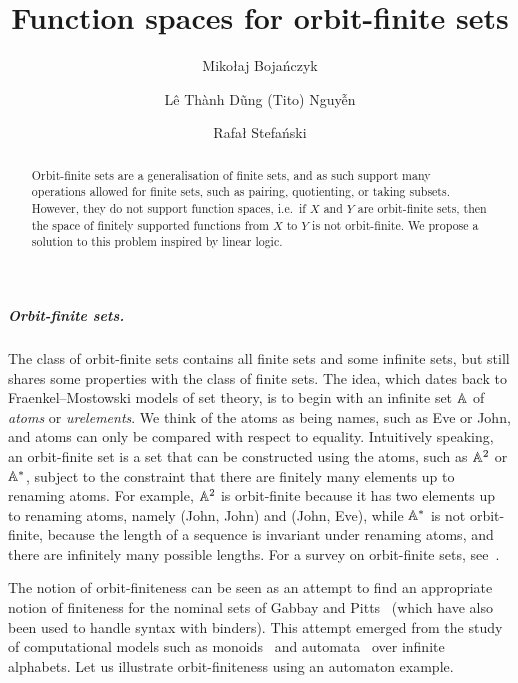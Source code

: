 \documentclass[a4paper,UKenglish,cleveref, autoref, thm-restate]{lipics-v2021}
\title{Function spaces for orbit-finite sets} %
\author{Mikołaj Bojańczyk}{University of Warsaw, Poland \and \url{https://www.mimuw.edu.pl/~bojan/}}{bojan@mimuw.edu.pl}{https://orcid.org/0000-0002-7758-1072}{}%
\author{Lê Thành Dũng (Tito) Nguy\~{\^{e}}n}{École normale supérieure de Lyon, France \and \url{https://nguyentito.eu/}}{nltd@nguyentito.eu}{https://orcid.org/0000-0002-6900-5577}{}
\author{Rafał Stefański}{University of Warsaw, Poland}{rafal.stefanski@mimuw.edu.pl}{https://orcid.org/0000-0002-8439-4056}{}%
\begin{document}
\newcommand{\loli}{\multimap}


\maketitle 
\begin{abstract}
    Orbit-finite sets are a generalisation of finite sets, and as such support many operations allowed for finite sets, such as pairing, quotienting, or taking subsets. However, they do not support function spaces, i.e.~if $X$ and $Y$ are orbit-finite sets, then the space of finitely supported functions from $X$ to $Y$ is not orbit-finite. We propose a solution to this problem inspired by linear logic.
\end{abstract}

\subparagraph{Orbit-finite sets.}

The class of orbit-finite sets contains all finite sets and some infinite sets, but still shares some properties with the class of finite sets.  The idea, which dates back to Fraenkel--Mostowski models of set theory,  is to begin with an infinite set $\mathbb A$ of \emph{atoms} or \emph{urelements}. We think of the atoms as being names, such as Eve or John, and atoms can only be compared with respect to equality. Intuitively speaking, an  orbit-finite set is a set  that can be constructed using the atoms, such as $\mathbb A^2$ or $\mathbb A^*$, subject to the constraint that there are finitely many elements up to  renaming atoms. For example, $\mathbb A^2$ is orbit-finite because it has two elements up to renaming atoms, namely (John, John) and (John, Eve), while $\mathbb A^*$ is not orbit-finite, because the length of a sequence is invariant under renaming atoms, and there are infinitely many possible lengths. For a survey on orbit-finite sets, see~\cite{bojanczyk_slightly2018}.

The notion of orbit-finiteness can be seen as an attempt to find an appropriate notion of finiteness for the  nominal sets of Gabbay and Pitts~\cite{PittsAM:nomsns} (which have also been used to handle syntax with binders).  This attempt emerged from the study of computational models such as monoids~\cite{bojanczykNominalMonoids2013} and automata~\cite{bojanczykAutomataTheoryNominal2014} over infinite alphabets. Let us illustrate orbit-finiteness using an automaton example.
\end{document}
